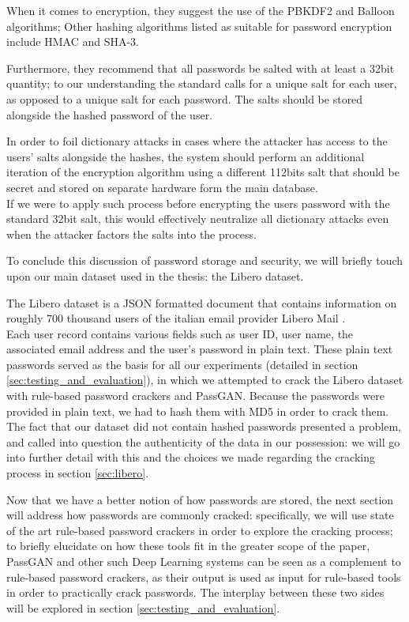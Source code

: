When it comes to encryption, they suggest the use of the PBKDF2 and Balloon algorithms; Other hashing algorithms listed as suitable for password encryption include HMAC and SHA-3.

Furthermore, they recommend that all passwords be salted with at least a 32bit quantity; to our understanding the standard calls for a unique salt for each user, as opposed to a unique salt for each password. The salts should be stored alongside the hashed password of the user.

In order to foil dictionary attacks in cases where the attacker has access to the users' salts alongside the hashes, the system should perform an additional iteration of the encryption algorithm using a different 112bits salt that should be secret and stored on separate hardware form the main database.\\
If we were to apply such process before encrypting the users password with the standard 32bit salt, this would effectively neutralize all dictionary attacks even when the attacker factors the salts into the process.

To conclude this discussion of password storage and security, we will briefly touch upon our main dataset used in the thesis: the Libero dataset.

The Libero dataset is a JSON formatted document that contains information on roughly 700 thousand users of the italian email provider Libero Mail \cite{libero_leak}.\\
Each user record contains various fields such as  user ID, user name, the associated email address and the user's password in plain text.
These plain text passwords served as the basis for all our experiments (detailed in section \ref{sec:testing_and_evaluation}), in which we attempted to crack the Libero dataset with rule-based password crackers and PassGAN. Because the passwords were provided in plain text, we had to hash them with MD5 in order to crack them.
The fact that our dataset did not contain hashed passwords presented a problem, and called into question the authenticity of the data in our possession: we will go into further detail with this  and the choices we made regarding the cracking process in section \ref{sec:libero}.  

Now that we have a better notion of how passwords are stored, the next section will address how passwords are commonly cracked: specifically, we will use state of the art rule-based password crackers in order to explore the cracking process; to briefly elucidate on how these tools fit in the greater scope of the paper, PassGAN and other such Deep Learning systems can be seen as a complement to rule-based password crackers, as their output is used as input for rule-based tools in order to practically crack passwords. The interplay between these two sides will be explored in section \ref{sec:testing_and_evaluation}.


